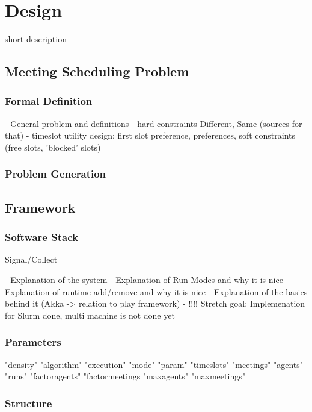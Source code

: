 \chapter{Design}

short description

\section{Meeting Scheduling Problem}

\subsection{Formal Definition}

- General problem and definitions
- hard constraints Different, Same (sources for that)
- timeslot utility design: first slot preference, preferences, soft constraints (free slots, 'blocked' slots)

\subsection{Problem Generation}

\section{Framework}
\subsection{Software Stack}
Signal/Collect

- Explanation of the system
- Explanation of Run Modes and why it is nice
- Explanation of runtime add/remove and why it is nice
- Explanation of the basics behind it (Akka -> relation to play framework)
- !!!! Stretch goal: Implemenation for Slurm done, multi machine is not done yet

\subsection{Parameters}

"density"
"algorithm"
"execution"
"mode"
"param"
"timeslots"
"meetings"
"agents"
"runs"
"factoragents"
"factormeetings
"maxagents"
"maxmeetings"

\subsection{Structure}

